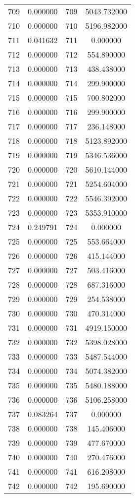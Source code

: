 \documentclass[12pt]{article}
\begin{document}
\begin{longtable}{@{}cccc@{}}
709 & 0.000000 & 709 & 5043.732000 \\
710 & 0.000000 & 710 & 5196.982000 \\
711 & 0.041632 & 711 & 0.000000 \\
712 & 0.000000 & 712 & 554.890000 \\
713 & 0.000000 & 713 & 438.438000 \\
714 & 0.000000 & 714 & 299.900000 \\
715 & 0.000000 & 715 & 700.802000 \\
716 & 0.000000 & 716 & 299.900000 \\
717 & 0.000000 & 717 & 236.148000 \\
718 & 0.000000 & 718 & 5123.892000 \\
719 & 0.000000 & 719 & 5346.536000 \\
720 & 0.000000 & 720 & 5610.144000 \\
721 & 0.000000 & 721 & 5254.604000 \\
722 & 0.000000 & 722 & 5546.392000 \\
723 & 0.000000 & 723 & 5353.910000 \\
724 & 0.249791 & 724 & 0.000000 \\
725 & 0.000000 & 725 & 553.664000 \\
726 & 0.000000 & 726 & 415.144000 \\
727 & 0.000000 & 727 & 503.416000 \\
728 & 0.000000 & 728 & 687.316000 \\
729 & 0.000000 & 729 & 254.538000 \\
730 & 0.000000 & 730 & 470.314000 \\
731 & 0.000000 & 731 & 4919.150000 \\
732 & 0.000000 & 732 & 5398.028000 \\
733 & 0.000000 & 733 & 5487.544000 \\
734 & 0.000000 & 734 & 5074.382000 \\
735 & 0.000000 & 735 & 5480.188000 \\
736 & 0.000000 & 736 & 5106.258000 \\
737 & 0.083264 & 737 & 0.000000 \\
738 & 0.000000 & 738 & 145.406000 \\
739 & 0.000000 & 739 & 477.670000 \\
740 & 0.000000 & 740 & 270.476000 \\
741 & 0.000000 & 741 & 616.208000 \\
742 & 0.000000 & 742 & 195.690000 \\

\end{longtable}
\end{document}
